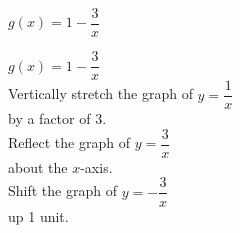 {$g(x) = 1 - \dfrac{3}{x}$}
{$g(x) = 1 - \dfrac{3}{x}$\\
Vertically stretch the graph of $y = \dfrac{1}{x}$\\
by a factor of 3.\\
Reflect the graph of $y = \dfrac{3}{x}$\\
about the $x$-axis.\\
Shift the graph of $y = -\dfrac{3}{x}$\\
up 1 unit.


\begin{center}
\end{center}}